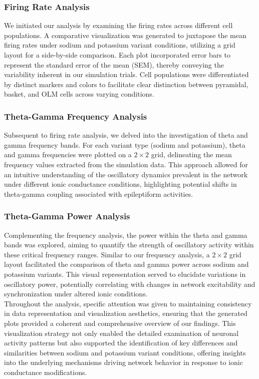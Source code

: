 \subsubsection{Firing Rate Analysis}
We initiated our analysis by examining the firing rates across different cell
populations. A comparative visualization was generated to juxtapose the mean
firing rates under sodium and potassium variant conditions, utilizing a grid
layout for a side-by-side comparison. Each plot incorporated error bars to
represent the standard error of the mean (SEM), thereby conveying the
variability inherent in our simulation trials. Cell populations were
differentiated by distinct markers and colors to facilitate clear distinction
between pyramidal, basket, and OLM cells across varying conditions.

\subsubsection{Theta-Gamma Frequency Analysis}
Subsequent to firing rate analysis, we delved into the investigation of theta
and gamma frequency bands. For each variant type (sodium and potassium), theta
and gamma frequencies were plotted on a \(2\times2\) grid, delineating the mean
frequency values extracted from the simulation data. This approach allowed for
an intuitive understanding of the oscillatory dynamics prevalent in the network
under different ionic conductance conditions, highlighting potential shifts in
theta-gamma coupling associated with epileptiform activities.

\subsubsection{Theta-Gamma Power Analysis}
Complementing the frequency analysis, the power within the theta and gamma
bands was explored, aiming to quantify the strength of oscillatory activity
within these critical frequency ranges. Similar to our frequency analysis, a
\(2\times2\) grid layout facilitated the comparison of theta and gamma power
across sodium and potassium variants. This visual representation served to
elucidate variations in oscillatory power, potentially correlating with changes
in network excitability and synchronization under altered ionic conditions.\\

\noindent Throughout the analysis, specific attention was given
to maintaining consistency in data representation and visualization aesthetics,
ensuring that the generated plots provided a coherent and comprehensive
overview of our findings. This visualization strategy not only enabled the
detailed examination of neuronal activity patterns but also supported the
identification of key differences and similarities between sodium and potassium
variant conditions, offering insights into the underlying mechanisms driving
network behavior in response to ionic conductance modifications.

